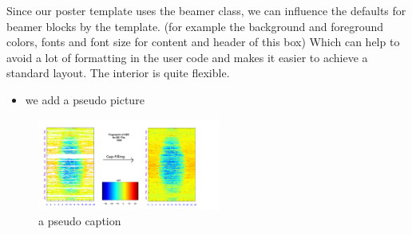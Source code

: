 
Since our poster template uses the beamer class,
we can influence the defaults for beamer blocks by the template.
(for example the background and foreground colors, fonts and font size for content and header of this box)
Which can help to avoid a lot of formatting in the user code and makes it easier to achieve a standard layout.
The interior is quite flexible.\\
\begin{itemize}
	\item we add a pseudo picture
\end{itemize}
	\begin{figure}[tb]
		\includegraphics[height=3cm]{images/content/DE-Tha_1998_FP_NEE_ffc.pdf}
    \caption{a pseudo caption}
	\end{figure}



